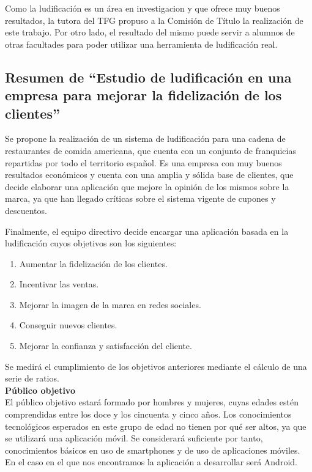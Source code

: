 \documentclass[twoside]{report}
\begin{document}
Como la ludificación es un área en investigacion y que ofrece muy buenos resultados, la tutora del TFG propuso a la Comisión de Título la realización de este trabajo. Por otro lado, el resultado del mismo puede servir a alumnos de otras facultades para poder utilizar una herramienta de ludificación real.

\subsection{Resumen de “Estudio de ludificación en una empresa para mejorar la fidelización de los clientes”}

Se propone la realización de un sistema de ludificación para una cadena de restaurantes de comida americana, que cuenta con un conjunto de franquicias repartidas por todo el territorio español. Es una empresa con muy buenos resultados económicos y cuenta con una amplia y sólida base de clientes, que decide elaborar una aplicación que mejore la opinión de los mismos sobre la marca, ya que han llegado críticas sobre el sistema vigente de cupones y descuentos.

Finalmente, el equipo directivo decide encargar una aplicación basada en la ludificación cuyos objetivos son los siguientes:

\begin{enumerate}
\item Aumentar la fidelización de los clientes.
\item Incentivar las ventas.
\item Mejorar la imagen de la marca en redes sociales.
\item Conseguir nuevos clientes.
\item Mejorar la confianza y satisfacción del cliente. 
\end{enumerate}

Se medirá el cumplimiento de los objetivos anteriores mediante el cálculo de una serie de ratios.\\

\textbf{Público objetivo}\\

El público objetivo estará formado por hombres y mujeres, cuyas edades estén comprendidas entre los doce y los cincuenta y cinco años. 
Los conocimientos tecnológicos esperados en este grupo de edad no tienen por qué ser altos, ya que se utilizará una aplicación móvil. Se considerará suficiente por tanto, conocimientos básicos en uso de smartphones y de uso de aplicaciones móviles. En el caso en el que nos encontramos la aplicación a desarrollar será Android.
\end{document}
